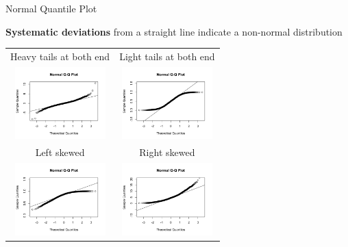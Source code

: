 \documentclass{beamer}\usepackage[]{graphicx}\usepackage[]{color}
\begin{document}
\begin{frame}{Normal Quantile Plot}

\textbf{Systematic deviations} from a straight line indicate a non-normal distribution

\begin{table}
\footnotesize
\centering
\begin{tabular}{ c  | c }			
   Heavy tails at both end & Light tails at both end \\
   \includegraphics[height=1.1in]{QQ3.png}  &  \includegraphics[height=1.1in]{QQ4.png} \\
   \hline
   Left skewed & Right skewed \\
   \includegraphics[height=1.1in]{QQ2.png}  &  \includegraphics[height=1.1in]{QQ1.png} \\
   
\end{tabular}
\end{table}
\end{frame}
\end{document}
